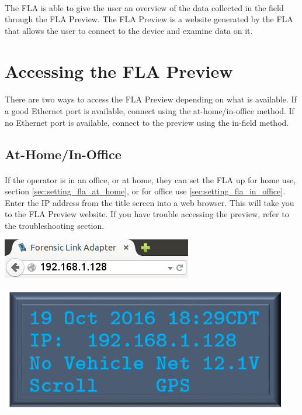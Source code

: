 \documentclass[11pt, oneside]{book}
\begin{document}
\paragraph{  }
The FLA is able to give the user an overview of the data collected in the field through the FLA Preview. The FLA Preview is a website generated by the FLA that allows the user to connect to the device and examine data on it.
\section{Accessing the FLA Preview}
\paragraph{  }
There are two ways to access the FLA Preview depending on what is available. If a good Ethernet port is available, connect using the at-home/in-office method. If no Ethernet port is available, connect to the preview using the in-field method.
\subsection{At-Home/In-Office}
\paragraph{  }
If the operator is in an office, or at home, they can set the FLA up for home use, section \ref{sec:setting_fla_at_home}, or for office use \ref{sec:setting_fla_in_office}. Enter the IP address from the title screen into a web browser. This will take you to the FLA Preview website. If you have trouble accessing the preview, refer to the troubleshooting section.
\\[\baselineskip]
\noindent\begin{minipage}{0.45\textwidth}%
	\includegraphics[width=\linewidth]{../media/fla_preview_screenshots/url_correct_2} 
\end{minipage}%
\hfill%
\begin{minipage}{0.45\textwidth} 
	\includegraphics[width=\linewidth]{../media/pstricks_files/01_main_screen_1_128_ip}
\end{minipage}
\end{document}
